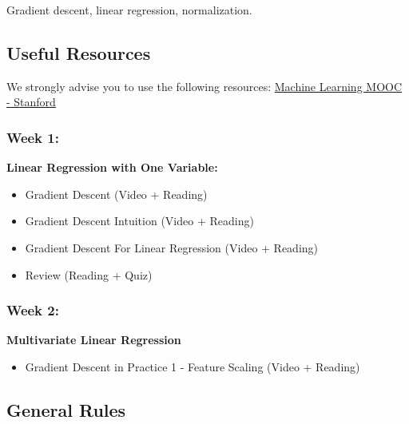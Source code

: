 \documentclass[]{article}
\providecommand{\tightlist}{%
  \setlength{\itemsep}{0pt}\setlength{\parskip}{0pt}}
\begin{document}
Gradient descent, linear regression, normalization.

\hypertarget{useful-resources}{%
\subsection{Useful Resources}\label{useful-resources}}

We strongly advise you to use the following resources:
\href{https://www.coursera.org/learn/machine-learning/home/week/1}{Machine
Learning MOOC - Stanford}

\hypertarget{week-1}{%
\subsubsection{Week 1:}\label{week-1}}

\textbf{Linear Regression with One Variable:}

\begin{itemize}
\item
  Gradient Descent (Video + Reading)
\item
  Gradient Descent Intuition (Video + Reading)
\item
  Gradient Descent For Linear Regression (Video + Reading)
\item
  Review (Reading + Quiz)
\end{itemize}

\hypertarget{week-2}{%
\subsubsection{Week 2:}\label{week-2}}

\textbf{Multivariate Linear Regression}

\begin{itemize}
\tightlist
\item
  Gradient Descent in Practice 1 - Feature Scaling (Video + Reading)
\end{itemize}

\hypertarget{general-rules}{%
\subsection{General Rules}\label{general-rules}}
\end{document}
